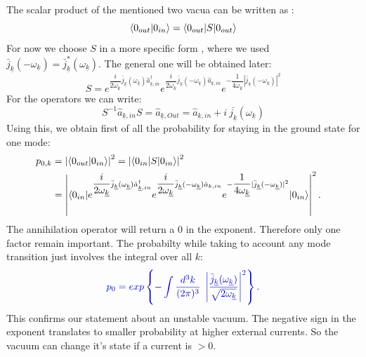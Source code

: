 \documentclass[12pt, titlepage]{article}
\begin{document}
The scalar product of the mentioned two vacua can be written as :
\begin{equation}
\braket{0_{out}|0_{in}}=\braket{0_{out}|S|0_{out}}
\end{equation}
For now we choose $ S $ in a more specific form , where we used $ \bar{j}_{\underline{k}}(-\omega_{\underline{k}}) = \bar{j}^{\ast}_{\underline{k}}(\omega_{\underline{k}})  $. The general one will be obtained later:
\begin{equation}
S=e^{\dfrac{i}{2\omega_{\underline{k}}}\bar{j}_{\underline{k}}(\omega_{\underline{k}})\hat{a}^{\dagger}_{\underline{k},in}}
e^{\dfrac{i}{2\omega_{\underline{k}}}\bar{j}_{\underline{k}}(-\omega_{\underline{k}})\hat{a}_{\underline{k},in}}
e^{-\dfrac{1}{4\omega_{\underline{k}}}|\bar{j}_{\underline{k}}(-\omega_{\underline{k}})|^{2}}
\end{equation}
For the operators we can write:
\begin{equation}
S^{-1}\hat{a}_{\underline{k},in}S=\hat{a}_{\underline{k},Out}=\hat{a}_{\underline{k},in} +i\ \bar{j_{\underline{k}}}(\omega_{\underline{k}})
\end{equation}
%
%
Using this, we obtain first of all the probability for staying in the ground state for one mode:
\begin{subequations}
\begin{align}
p_{0,k}&=\left| \braket{0_{out}|0_{in}}\right|^{2}=\left| \braket{0_{in}|S|0_{in}}\right|^{2}
	&\\
	&=\left| \braket{0_{in}|e^{\dfrac{i}{2\omega_{\underline{k}}}\bar{j}_{\underline{k}}(\omega_{\underline{k}})\hat{a}^{\dagger}_{\underline{k},in}}
e^{\dfrac{i}{2\omega_{\underline{k}}}\bar{j}_{\underline{k}}(-\omega_{\underline{k}})\hat{a}_{k,in}}
e^{-\dfrac{1}{4\omega_{\underline{k}}}|\bar{j}_{\underline{k}}(-\omega_{\underline{k}})|^{2}}|0_{in}}\right|^{2}
.
\end{align}
\end{subequations}
The annihilation operator will return a $ 0 $ in the exponent. Therefore only one factor remain important. The probabilty while taking to account any mode transition just involves the integral over all $ k $:
\begin{equation}\label{prob_staying}
 \textcolor[RGB]{0,0,204}{
	p_{0}
	= 	exp\left\lbrace -\int \dfrac{d^{3}k}{(2\pi)^{3}} \ 
 		 			 \left| \dfrac{\bar{j}_{\underline{k}}(\omega_{\underline{k}})}{\sqrt{2\omega_{\underline{k}}}} \right|^{2}
 		 			 \right\rbrace 
 .}
\end{equation}
This confirms our statement about an unstable vacuum. The negative sign in the exponent translates to smaller probability at higher external currents. So the vacuum can change it's state if a current is $ >0 $.
\end{document}
